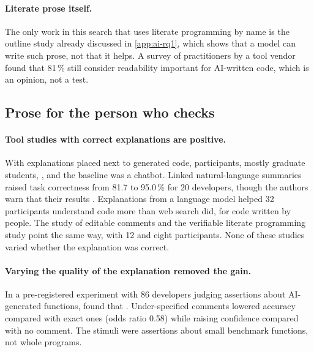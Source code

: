 \paragraph{Literate prose itself.}
The only work in this search that uses literate programming by name is the
outline study already discussed in \cref{app:ai-rq1}, which shows that a model
can write such prose, not that it helps\autocite{Shi2025NLO}.
A survey of practitioners by a tool vendor found that 81\,\% still consider
readability important for AI-written code\autocite{%
takerngsaksiri2025readability}, which is an opinion, not a test.

\subsection{Prose for the person who checks}

\paragraph{Tool studies with correct explanations are positive.}
With explanations placed next to generated code, participants, mostly graduate
students, , and the
baseline was a chatbot.
Linked natural-language summaries raised task correctness from 81.7 to 95.0\,\%
for 20 developers, though the authors warn that their results
.
Explanations from a language model helped 32 participants understand code more
than web search did, for code written by people\autocite{nam2024gilt}.
The study of editable comments\autocite{di2025mutual} and the verifiable
literate programming study\autocite{Yuan2026VLP} point the same way, with 12
and eight participants.
None of these studies varied whether the explanation was correct.

\paragraph{Varying the quality of the explanation removed the gain.}
In a pre-registered experiment with 86 developers judging assertions about
AI-generated functions, \textcite{kaufman2026assertions} found that
.
Under-specified comments lowered accuracy compared with exact ones (odds ratio
0.58) while raising confidence compared with no comment.
The stimuli were assertions about small benchmark functions, not whole
programs.

